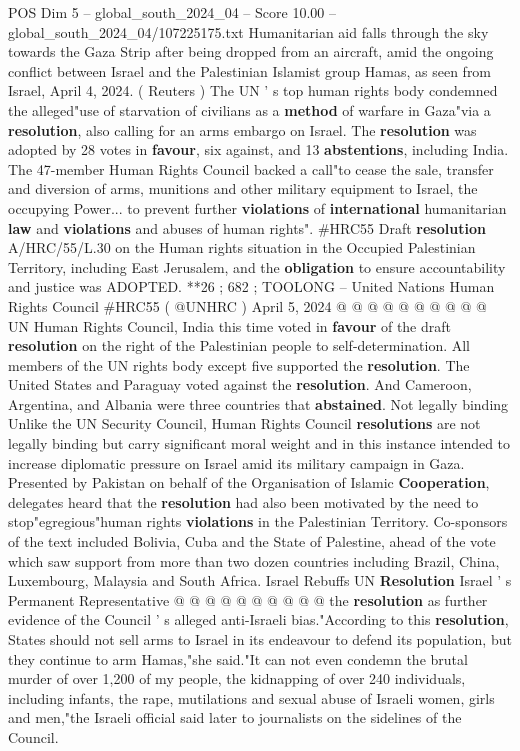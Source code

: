 \begin{textsample}{POS Dim 5 – global\_south\_2024\_04 – Score 10.00 – global\_south\_2024\_04/107225175.txt}  \label{ex:f5_pos_275}
Humanitarian aid falls through the sky towards the Gaza Strip after being dropped from an aircraft, amid the ongoing conflict between Israel and the Palestinian Islamist group Hamas, as seen from Israel, April 4, 2024. ( Reuters ) The UN ' s top human rights body condemned the alleged"use of starvation of civilians as a \textbf{method} of warfare in Gaza"via a \textbf{resolution}, also calling for an arms embargo on Israel.
The \textbf{resolution} was adopted by 28 votes in \textbf{favour}, six against, and 13 \textbf{abstentions}, including India.
The 47-member Human Rights Council backed a call"to cease the sale, transfer and diversion of arms, munitions and other military equipment to Israel, the occupying Power... to prevent further \textbf{violations} of \textbf{international} humanitarian \textbf{law} and \textbf{violations} and abuses of human rights". \#HRC55 Draft \textbf{resolution} A/HRC/55/L.30 on the Human rights situation in the Occupied Palestinian Territory, including East Jerusalem, and the \textbf{obligation} to ensure accountability and justice was ADOPTED. **26 ; 682 ; TOOLONG -- United Nations Human Rights Council \#HRC55 ( @UNHRC ) April 5, 2024 @ @ @ @ @ @ @ @ @ @ UN Human Rights Council, India this time voted in \textbf{favour} of the draft \textbf{resolution} on the right of the Palestinian people to self-determination.
All members of the UN rights body except five supported the \textbf{resolution}.
The United States and Paraguay voted against the \textbf{resolution}.
And Cameroon, Argentina, and Albania were three countries that \textbf{abstained}.
Not legally binding Unlike the UN Security Council, Human Rights Council \textbf{resolutions} are not legally binding but carry significant moral weight and in this instance intended to increase diplomatic pressure on Israel amid its military campaign in Gaza.
Presented by Pakistan on behalf of the Organisation of Islamic \textbf{Cooperation}, delegates heard that the \textbf{resolution} had also been motivated by the need to stop"egregious"human rights \textbf{violations} in the Palestinian Territory.
Co-sponsors of the text included Bolivia, Cuba and the State of Palestine, ahead of the vote which saw support from more than two dozen countries including Brazil, China, Luxembourg, Malaysia and South Africa.
Israel Rebuffs UN \textbf{Resolution} Israel ' s Permanent Representative @ @ @ @ @ @ @ @ @ @ the \textbf{resolution} as further evidence of the Council ' s alleged anti-Israeli bias."According to this \textbf{resolution}, States should not sell arms to Israel in its endeavour to defend its population, but they continue to arm Hamas,"she said."It can not even condemn the brutal murder of over 1,200 of my people, the kidnapping of over 240 individuals, including infants, the rape, mutilations and sexual abuse of Israeli women, girls and men,"the Israeli official said later to journalists on the sidelines of the Council.

\end{textsample}
